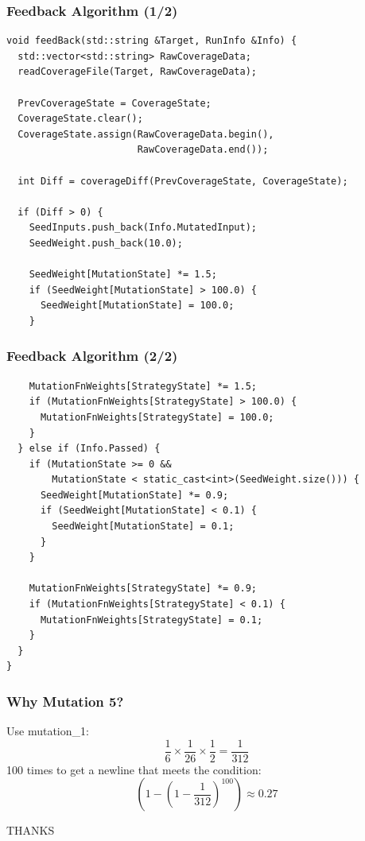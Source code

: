 \documentclass{beamer}
\begin{document}
\begin{frame}[fragile]
\frametitle{Feedback Algorithm (1/2)}
\begin{lstlisting}
void feedBack(std::string &Target, RunInfo &Info) {
  std::vector<std::string> RawCoverageData;
  readCoverageFile(Target, RawCoverageData);

  PrevCoverageState = CoverageState;
  CoverageState.clear();
  CoverageState.assign(RawCoverageData.begin(),
                       RawCoverageData.end());

  int Diff = coverageDiff(PrevCoverageState, CoverageState);

  if (Diff > 0) {
    SeedInputs.push_back(Info.MutatedInput);
    SeedWeight.push_back(10.0);
    
    SeedWeight[MutationState] *= 1.5;
    if (SeedWeight[MutationState] > 100.0) {
      SeedWeight[MutationState] = 100.0;
    }
\end{lstlisting}
\end{frame}

\begin{frame}[fragile]
\frametitle{Feedback Algorithm (2/2)}
\begin{lstlisting}
    MutationFnWeights[StrategyState] *= 1.5;
    if (MutationFnWeights[StrategyState] > 100.0) {
      MutationFnWeights[StrategyState] = 100.0;
    }
  } else if (Info.Passed) {
    if (MutationState >= 0 && 
        MutationState < static_cast<int>(SeedWeight.size())) {
      SeedWeight[MutationState] *= 0.9;
      if (SeedWeight[MutationState] < 0.1) {
        SeedWeight[MutationState] = 0.1;
      }
    }
    
    MutationFnWeights[StrategyState] *= 0.9;
    if (MutationFnWeights[StrategyState] < 0.1) {
      MutationFnWeights[StrategyState] = 0.1;
    }
  }
}
\end{lstlisting}
\end{frame}

\begin{frame}[fragile]
\frametitle{Why Mutation 5?}
Use mutation\_1:
$$
\frac{1}{6} \times \frac{1}{26} \times \frac{1}{2} =\frac{1}{312}
$$
100 times to get a newline that meets the condition:
$$
\left(1 - \left(1 - \frac{1}{312}\right)^{100}\right) \approx 0.27
$$
\end{frame}

\begin{frame}
\begin{center}
    \huge THANKS
\end{center}
\end{frame}
\end{document}
